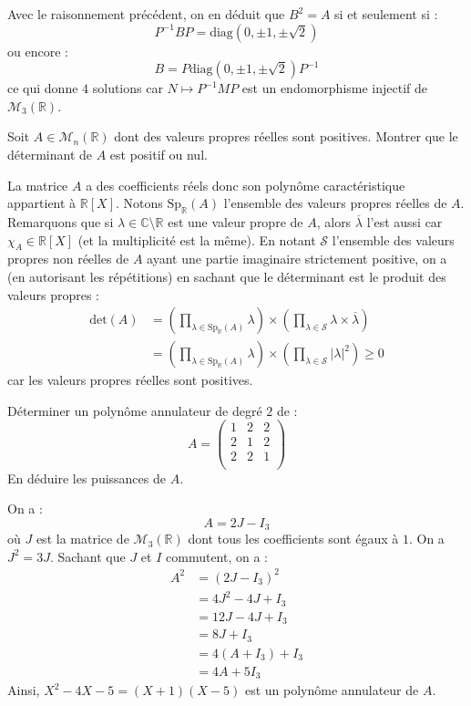\documentclass[a4paper,10pt]{report}
\begin{document}
\begin{enumerate}
\medskip

\noindent Avec le raisonnement précédent, on en déduit que $B^2=A$ si et seulement si :
$$ P^{-1} B P = \textrm{diag}(0, \pm 1, \pm \sqrt{2})$$
ou encore :
$$ B = P \textrm{diag}(0, \pm 1, \pm \sqrt{2}) P^{-1}$$
ce qui donne $4$ solutions car $N \mapsto P^{-1}MP$ est un endomorphisme injectif de $\mathcal{M}_3(\mathbb{R})$.
\end{enumerate}

\begin{Exercice}{} Soit $A \in \mathcal{M}_{n}(\mathbb{R})$ dont des valeurs propres réelles sont positives. Montrer que le déterminant de $A$ est positif ou nul.
\end{Exercice} 

\corr La matrice $A$ a des coefficients réels donc son polynôme caractéristique appartient à $\mathbb{R}[X]$. Notons $\textrm{Sp}_{\mathbb{R}}(A)$ l'ensemble des valeurs propres réelles de $A$. Remarquons que si $\lambda \in \mathbb{C} \setminus \mathbb{R}$ est une valeur propre de $A$, alors $\overline{\lambda}$ l'est aussi car $\chi_A \in \mathbb{R}[X]$ (et la multiplicité est la même). En notant $\mathcal{S}$ l'ensemble des valeurs propres non réelles de $A$ ayant une partie imaginaire strictement positive, on a (en autorisant les répétitions) en sachant que le déterminant est le produit des valeurs propres :
\begin{align*}
 \textrm{det}(A) & = \left(\prod_{ \lambda \in \textrm{Sp}_{\mathbb{R}}(A)} \lambda \right) \times \left(\prod_{ \lambda \in \mathcal{S}} \lambda  \times \overline{\lambda }\right)  \\
&  = \left(\prod_{ \lambda \in \textrm{Sp}_{\mathbb{R}}(A)} \lambda \right) \times \left(\prod_{ \lambda \in \mathcal{S}} \vert \lambda \vert ^2\right) \geq 0 
 \end{align*}
  car les valeurs propres réelles sont positives.

 
 
\begin{Exercice}{} Déterminer un polynôme annulateur de degré $2$ de :
$$ A = \begin{pmatrix}
1 & 2 & 2 \\
2 & 1 & 2 \\
2 & 2 & 1 \\
\end{pmatrix}$$
En déduire les puissances de $A$. 
\end{Exercice}

\corr On a :
$$ A= 2J-I_3$$
où $J$ est la matrice de $\mathcal{M}_3(\mathbb{R})$ dont tous les coefficients sont égaux à $1$. On a $J^2=3J$. Sachant que $J$ et $I$ commutent, on a :
\begin{align*}
A^2 & = (2J-I_3)^2 \\
& = 4J^2 - 4J+ I_3 \\
& = 12J-4J+I_3 \\
& = 8J+I_3 \\
& = 4(A+I_3) + I_3 \\
& = 4A +5I_3
\end{align*}
Ainsi, $X^2-4X-5=(X+1)(X-5)$ est un polynôme annulateur de $A$.
\end{document}
